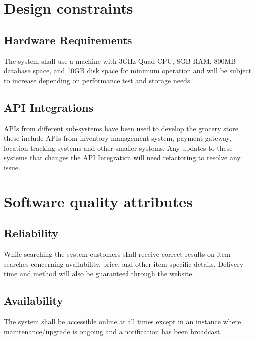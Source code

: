 \documentclass{scrreprt}
\theoremstyle{funreq}
\begin{document}
	\section{Design constraints}
	\subsection{Hardware Requirements}
	The system shall use a machine with  3GHz Quad CPU, 8GB RAM, 800MB database space, and 10GB disk space for minimum operation and will be subject to increase depending on performance test and storage needs.

	\subsection{API Integrations}
	APIs from different sub-systems have been used to develop the grocery store these include APIs from  inventory management system, payment gateway, location tracking systems and other smaller systems. Any updates to these systems that changes the API Integration will need refactoring to resolve any issue.
	
	
	\section{Software quality attributes}
	\subsection{Reliability}
	While searching the system customers shall receive correct results on item searches concerning availability, price, and other item specific details. Delivery time and method will also be guaranteed through the website.
	
	\subsection{Availability}
	The system shall be accessible online at all times except in an instance where maintenance/upgrade is ongoing and a notification has been broadcast.
	
\end{document}
